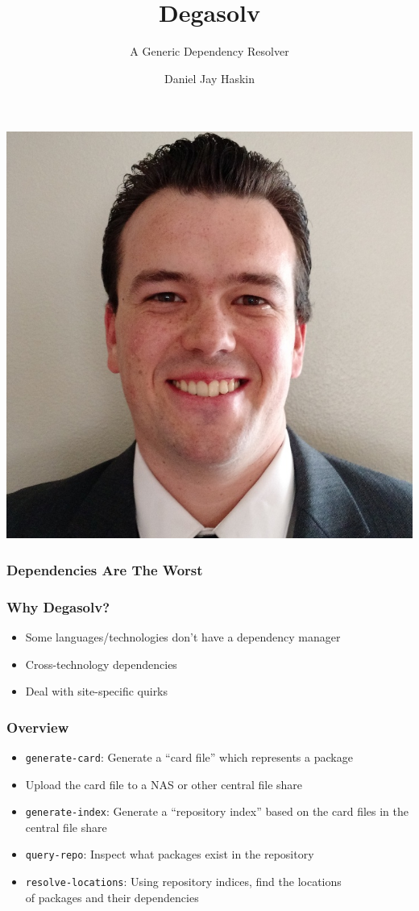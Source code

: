 \documentclass{beamer}
\title{Degasolv}
\subtitle{A Generic Dependency Resolver}
\author{Daniel Jay Haskin}
\begin{document}
\begin{frame}
  \titlepage
\end{frame}
\begin{frame}
  \centerline{\includegraphics[scale=0.15]{DanielHaskin-small.jpg}}
\end{frame}
\begin{frame}[fragile]
  \frametitle{Dependencies Are The Worst}

\end{frame}
\begin{frame}
  \frametitle{Why Degasolv?}
  \begin{itemize}
  \item Some languages/technologies don't have a dependency manager
    \pause
  \item Cross-technology dependencies
    \pause
  \item Deal with site-specific quirks
  \end{itemize}
\end{frame}
\begin{frame}
  \frametitle{Overview}
  \begin{itemize}
  \item \texttt{generate-card}: Generate a ``card file'' which represents a package
  \item Upload the card file to a NAS or other central file share
  \item \texttt{generate-index}: Generate a ``repository index'' based on the card files in the central file share
  \item \texttt{query-repo}: Inspect what packages exist in the repository
  \item \texttt{resolve-locations}: Using repository indices, find the locations \\
    of packages and their dependencies
  \end{itemize}
\end{frame}
\end{document}
